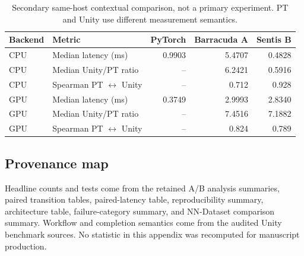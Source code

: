 \begin{table}[t]
\centering
\caption{Secondary same-host contextual comparison, not a primary experiment. PT and Unity use different measurement semantics.}
\label{tab:pt-context}
\small
\begin{tabular}{@{}llrrr@{}}
\toprule
Backend & Metric & PyTorch & Barracuda A & Sentis B \\
\midrule
CPU & Median latency (ms) & 0.9903 & 5.4707 & 0.4828 \\
CPU & Median Unity/PT ratio & -- & 6.2421 & 0.5916 \\
CPU & Spearman PT $\leftrightarrow$ Unity & -- & 0.712 & 0.928 \\
GPU & Median latency (ms) & 0.3749 & 2.9993 & 2.8340 \\
GPU & Median Unity/PT ratio & -- & 7.4516 & 7.1882 \\
GPU & Spearman PT $\leftrightarrow$ Unity & -- & 0.824 & 0.789 \\
\bottomrule
\end{tabular}
\end{table}

\subsection{Provenance map}
Headline counts and tests come from the retained A/B analysis summaries, paired transition tables, paired-latency table, reproducibility summary, architecture table, failure-category summary, and NN-Dataset comparison summary. Workflow and completion semantics come from the audited Unity benchmark sources. No statistic in this appendix was recomputed for manuscript production.
